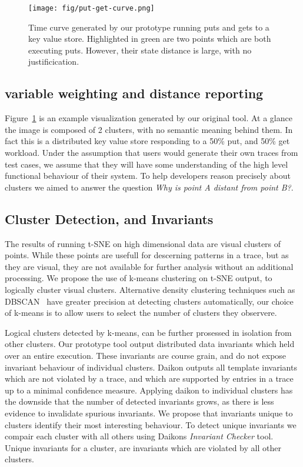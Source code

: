 \begin{figure}[t]
\centering
    \texttt{[image: fig/put-get-curve.png]}

    \caption{
        Time curve generated by our prototype running puts and gets to
        a key value store. Highlighted in green are two points which
        are both executing puts. However, their state distance is
        large, with no justificication.
    }

    \label{fig:desparate-points}
\end{figure}

\subsection{variable weighting and distance reporting}
Figure~\ref{fig:desparate-points} is an example
visualization generated by our original tool. At a glance the image is
composed of 2 clusters, with no semantic meaning behind them.
In fact this is a distributed key value store responding to a 50\%
put, and 50\% get workload. Under the assumption that users would
generate their own traces from test cases, we assume that they will
have some understanding of the high level functional behaviour of
their system. To help developers reason precisely about clusters we
aimed to answer the question \emph{Why is point A distant from point
B?}.

\subsection{Cluster Detection, and Invariants}
The results of running t-SNE on high dimensional data are visual
clusters of points. While these points are usefull for descerning
patterns in a trace, but as they are visual, they are not available
for further analysis without an additional processing. We propose the
use of k-means clustering on t-SNE output, to logically cluster visual
clusters. Alternative density clustering techniques such as
DBSCAN~\cite{Ester96adensity-based} have greater precision at detecting
clusters automatically, our choice of k-means is to allow users to
select the number of clusters they observere.

Logical clusters detected by k-means, can be further prosessed in
isolation from other clusters. Our prototype tool output distributed
data invariants which held over an entire execution. These invariants
are course grain, and do not expose invariant behaviour of individual
clusters.  
%
Daikon outputs all template invariants which are not violated by a
trace, and which are supported by entries in a trace up to a minimal
confidence measure. Applying daikon to individual clusters has the
downside that the number of detected invariants grows, as there is
less evidence to invalidate spurious invariants. We propose that
invariants unique to clusters identify their most interesting
behaviour. To detect unique invariants we compair each cluster with
all others using Daikons \emph{Invariant Checker} tool. Unique
invariants for a cluster, are invariants which are violated by all
other clusters.



